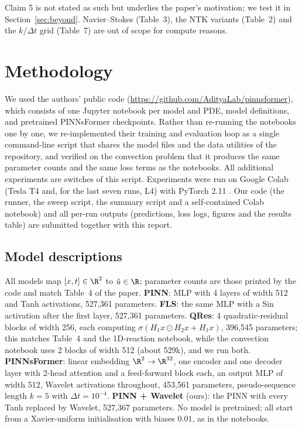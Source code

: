 \documentclass[10pt]{article} %
\begin{document}
Claim 5 is not stated as such but underlies the paper's motivation; we test it in Section~\ref{sec:beyond}. Navier--Stokes (Table~3), the NTK variants (Table~2) and the $k$/$\Delta t$ grid (Table~7) are out of scope for compute reasons.

\section{Methodology}
We used the authors' public code (\url{https://github.com/AdityaLab/pinnsformer}), which consists of one Jupyter notebook per model and PDE, model definitions, and pretrained PINNsFormer checkpoints. Rather than re-running the notebooks one by one, we re-implemented their training and evaluation loop as a single command-line script that shares the model files and the data utilities of the repository, and verified on the convection problem that it produces the same parameter counts and the same loss terms as the notebooks. All additional experiments are switches of this script. Experiments were run on Google Colab (Tesla T4 and, for the last seven runs, L4) with PyTorch 2.11 \citep{paszke2019pytorch}. Our code (the runner, the sweep script, the summary script and a self-contained Colab notebook) and all per-run outputs (predictions, loss logs, figures and the results table) are submitted together with this report.

\subsection{Model descriptions}
All models map $[x,t]\in\R^2$ to $\hat u\in\R$; parameter counts are those printed by the code and match Table~4 of the paper. \textbf{PINN}: MLP with 4 layers of width 512 and Tanh activations, 527{,}361 parameters. \textbf{FLS}: the same MLP with a Sin activation after the first layer, 527{,}361 parameters. \textbf{QRes}: 4 quadratic-residual blocks of width 256, each computing $\sigma(H_1x\odot H_2x + H_1x)$, 396{,}545 parameters; this matches Table~4 and the 1D-reaction notebook, while the convection notebook uses 2 blocks of width 512 (about 529k), and we run both. \textbf{PINNsFormer}: linear embedding $\R^2\to\R^{32}$, one encoder and one decoder layer with 2-head attention and a feed-forward block each, an output MLP of width 512, Wavelet activations throughout, 453{,}561 parameters, pseudo-sequence length $k=5$ with $\Delta t=10^{-4}$. \textbf{PINN + Wavelet} (ours): the PINN with every Tanh replaced by Wavelet, 527{,}367 parameters. No model is pretrained; all start from a Xavier-uniform initialisation with biases $0.01$, as in the notebooks.
\end{document}
